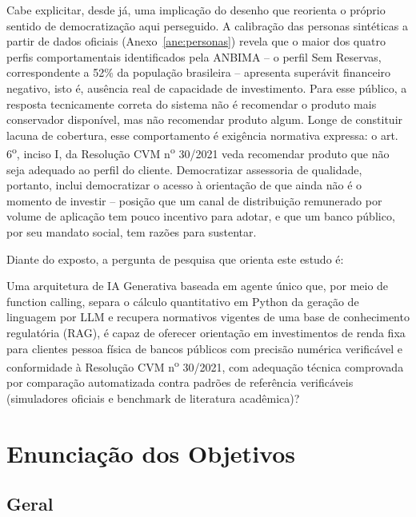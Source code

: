 Cabe explicitar, desde j\'a, uma implica\c{c}\~ao do desenho que reorienta
o pr\'oprio sentido de democratiza\c{c}\~ao aqui perseguido. A
calibra\c{c}\~ao das personas sint\'eticas a partir de dados oficiais
(Anexo~\ref{ane:personas}) revela que o maior dos quatro perfis
comportamentais identificados pela ANBIMA -- o perfil Sem Reservas,
correspondente a 52\% da popula\c{c}\~ao brasileira -- apresenta
super\'avit financeiro negativo, isto \'e, aus\^encia real de capacidade
de investimento. Para esse p\'ublico, a resposta tecnicamente correta do
sistema n\~ao \'e recomendar o produto mais conservador dispon\'ivel, mas
n\~ao recomendar produto algum. Longe de constituir lacuna de cobertura,
esse comportamento \'e exig\^encia normativa expressa: o art.
6\textsuperscript{o}, inciso I, da Resolu\c{c}\~ao CVM
n\textsuperscript{o} 30/2021 \autocite{resolucaocvm30} veda recomendar
produto que n\~ao seja adequado ao perfil do cliente. Democratizar
assessoria de qualidade, portanto, inclui democratizar o acesso \`a
orienta\c{c}\~ao de que ainda n\~ao \'e o momento de investir -- posi\c{c}\~ao
que um canal de distribui\c{c}\~ao remunerado por volume de aplica\c{c}\~ao
tem pouco incentivo para adotar, e que um banco p\'ublico, por seu
mandato social, tem raz\~oes para sustentar.

Diante do exposto, a pergunta de pesquisa que orienta este estudo \'e:

\begin{citacao}
Uma arquitetura de IA Generativa baseada em agente \'unico que, por meio
de function calling, separa o c\'alculo quantitativo em Python da
gera\c{c}\~ao de linguagem por LLM e recupera normativos vigentes de uma
base de conhecimento regulat\'oria (RAG), \'e capaz de oferecer
orienta\c{c}\~ao em investimentos de renda fixa para clientes pessoa
f\'isica de bancos p\'ublicos com precis\~ao num\'erica verific\'avel e conformidade \`a
Resolu\c{c}\~ao CVM n\textsuperscript{o} 30/2021, com adequa\c{c}\~ao
t\'ecnica comprovada por compara\c{c}\~ao automatizada contra padr\~oes
de refer\^encia verific\'aveis (simuladores oficiais e benchmark de
literatura acad\^emica)?
\end{citacao}

\section{Enuncia\c{c}\~ao dos Objetivos}
\label{sec:objetivos}

\subsection{Geral}
\label{subsec:objetivo-geral}

